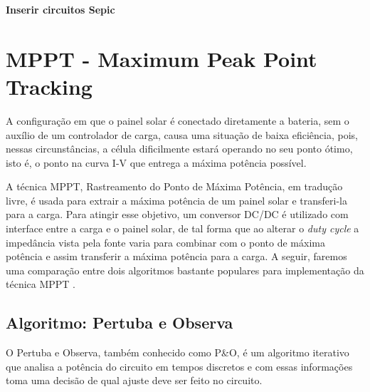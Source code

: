 \textbf{ Inserir circuitos Sepic }


\section{MPPT - Maximum Peak Point Tracking}\label{mppt_revision}
A configuração em que o painel solar é conectado diretamente a bateria, sem o auxílio de um controlador de carga, causa uma situação de baixa eficiência, pois, nessas circunstâncias, a célula dificilmente estará operando no seu ponto ótimo, isto é, o ponto na curva I-V que entrega a máxima potência possível.

A técnica MPPT, Rastreamento do Ponto de Máxima Potência, em tradução livre, é usada para extrair a máxima potência de um painel solar e transferi-la para a carga. Para atingir esse objetivo, um conversor DC/DC é utilizado com interface entre a carga e o painel solar, de tal forma que ao alterar o \textit{duty cycle} a impedância vista pela fonte varia para combinar com o ponto de máxima potência e assim transferir a máxima potência para a carga. A seguir, faremos uma comparação entre dois algoritmos bastante populares para implementação da técnica MPPT \cite{mppt_comparison}.

\subsection*{Algoritmo: Pertuba e Observa}
O Pertuba e Observa, também conhecido como P\&O, é um algoritmo iterativo que analisa a potência do circuito em tempos discretos e com essas informações toma uma decisão de qual ajuste deve ser feito no circuito. 

\noindent
\begin{minipage}{\linewidth}
\label{PO_flux_fig}
\end{minipage}

